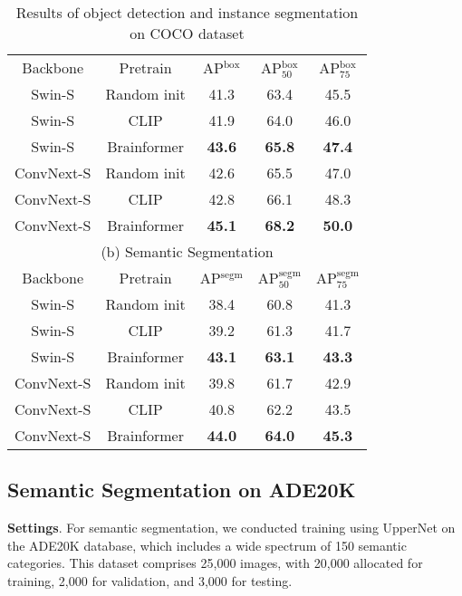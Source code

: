 \begin{table}[!b]
\centering
    \vspace{-5mm}
    \caption{Results of object detection and instance segmentation on COCO dataset}
    \label{tab:coco_object_detection}
    \vspace{-3mm}
    \begin{tabular}{c|c|ccc}
    \Xhline{1.0pt}
    \multicolumn{5}{c}{{(a) Object Detection}}  \\  
    \hline
    Backbone & Pretrain & AP$^\text{box}$ & AP$^\text{box}_\text{50}$ & AP$^\text{box}_\text{75}$ \\%
    \hline
     Swin-S &  Random init & {41.3} & {63.4} & {45.5} \\
     Swin-S &  CLIP \cite{clip} & {41.9} & {64.0} & {46.0} \\
     Swin-S &  Brainformer & \textbf{43.6} & \textbf{65.8} & \textbf{47.4} \\
     \hline
     ConvNext-S &  Random init & {42.6} & {65.5} & {47.0}\\
     ConvNext-S &  CLIP \cite{clip} & {42.8} & {66.1} & {48.3} \\
     ConvNext-S &  Brainformer & \textbf{45.1} & \textbf{68.2} & \textbf{50.0} \\               
    \hline
    \multicolumn{5}{c}{{(b) Semantic Segmentation}}  \\
    \hline
     Backbone & Pretrain & AP$^\text{segm}$ & AP$^\text{segm}_\text{50}$ & AP$^\text{segm}_\text{75}$ \\%
    \hline
     Swin-S &  Random init  & {38.4} & {60.8} & {41.3}\\
     Swin-S &  CLIP\cite{clip} & {39.2}  & {61.3} & {41.7}\\
     Swin-S &  Brainformer  & \textbf{43.1} & \textbf{63.1} & \textbf{43.3} \\
     \hline
     ConvNext-S &  Random init  & {39.8} & {61.7} & {42.9}\\
     ConvNext-S &  CLIP \cite{clip} & {40.8}  & {62.2} & {43.5} \\
     ConvNext-S &  Brainformer & \textbf{44.0} & \textbf{64.0} & \textbf{45.3} \\   
     \hline
\end{tabular}
\end{table}


\subsection{Semantic Segmentation on ADE20K}
\textbf{Settings}. For semantic segmentation, we conducted training using UpperNet \cite{uppernet} on the ADE20K database, which includes a wide spectrum of 150 semantic categories. This dataset comprises 25,000 images, with 20,000 allocated for training, 2,000 for validation, and 3,000 for testing. 

